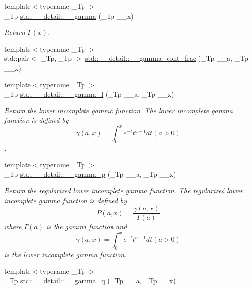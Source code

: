\begin{DoxyCompactItemize}
{\footnotesize template$<$typename \+\_\+\+Tp $>$ }\\\+\_\+\+Tp \hyperlink{namespacestd_1_1____detail_aa0e76080654c918631595a7da642913f}{std\+::\+\_\+\+\_\+detail\+::\+\_\+\+\_\+gamma} (\+\_\+\+Tp \+\_\+\+\_\+x)
\begin{DoxyCompactList}\small\item\em Return $ \Gamma(x) $. \end{DoxyCompactList}\item 
{\footnotesize template$<$typename \+\_\+\+Tp $>$ }\\std\+::pair$<$ \+\_\+\+Tp, \+\_\+\+Tp $>$ \hyperlink{namespacestd_1_1____detail_afd6319747af991947a02388acee40c26}{std\+::\+\_\+\+\_\+detail\+::\+\_\+\+\_\+gamma\+\_\+cont\+\_\+frac} (\+\_\+\+Tp \+\_\+\+\_\+a, \+\_\+\+Tp \+\_\+\+\_\+x)
\item 
{\footnotesize template$<$typename \+\_\+\+Tp $>$ }\\\+\_\+\+Tp \hyperlink{namespacestd_1_1____detail_a18fe1f8c781d5964d28e9525127e4fdb}{std\+::\+\_\+\+\_\+detail\+::\+\_\+\+\_\+gamma\+\_\+l} (\+\_\+\+Tp \+\_\+\+\_\+a, \+\_\+\+Tp \+\_\+\+\_\+x)
\begin{DoxyCompactList}\small\item\em Return the lower incomplete gamma function. The lower incomplete gamma function is defined by \[ \gamma(a,x) = \int_0^x e^{-t}t^{a-1}dt (a > 0) \]. \end{DoxyCompactList}\item 
{\footnotesize template$<$typename \+\_\+\+Tp $>$ }\\\+\_\+\+Tp \hyperlink{namespacestd_1_1____detail_a4583981bd73c3d3bba970c2f91dc4ba5}{std\+::\+\_\+\+\_\+detail\+::\+\_\+\+\_\+gamma\+\_\+p} (\+\_\+\+Tp \+\_\+\+\_\+a, \+\_\+\+Tp \+\_\+\+\_\+x)
\begin{DoxyCompactList}\small\item\em Return the regularized lower incomplete gamma function. The regularized lower incomplete gamma function is defined by \[ P(a,x) = \frac{\gamma(a,x)}{\Gamma(a)} \] where $ \Gamma(a) $ is the gamma function and \[ \gamma(a,x) = \int_0^x e^{-t}t^{a-1}dt (a > 0) \] is the lower incomplete gamma function. \end{DoxyCompactList}\item 
{\footnotesize template$<$typename \+\_\+\+Tp $>$ }\\\+\_\+\+Tp \hyperlink{namespacestd_1_1____detail_a0ac19486073d0a7b2dc923b45b26777c}{std\+::\+\_\+\+\_\+detail\+::\+\_\+\+\_\+gamma\+\_\+q} (\+\_\+\+Tp \+\_\+\+\_\+a, \+\_\+\+Tp \+\_\+\+\_\+x)

\end{DoxyCompactItemize}
